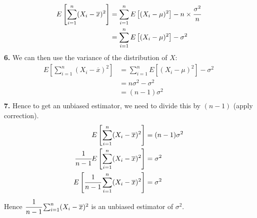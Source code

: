 \documentclass{report}
\begin{document}
            \[\begin{split}
                E\left[ \sum_{i = 1}^n ( X_i - \overline{x} )^2 \right] &= \sum_{i = 1}^n E\left[ (X_i - \mu)^2 \right] - n \times \cfrac{\sigma^2}{n}\\
                &= \sum_{i = 1}^n E\left[ (X_i - \mu)^2 \right] - \sigma^2\\
            \end{split}\]
            \textbf{6. } We can then use the variance of the distribution of $X$:
            \[\begin{split}
                E\left[ \sum_{i = 1}^n ( X_i - \overline{x} )^2 \right] &= \sum_{i = 1}^n E\left[ (X_i - \mu)^2 \right] - \sigma^2\\
                &= n \sigma^2 - \sigma^2\\
                &= (n - 1) \sigma^2\\
            \end{split}\]
            \textbf{7. } Hence to get an unbiased estimator, we need to divide this by $(n-1)$ (apply correction).
            \[\begin{split}
                E\left[ \sum_{i = 1}^n ( X_i - \overline{x} )^2 \right] &= (n - 1) \sigma^2\\
                \cfrac{1}{n-1} E\left[ \sum_{i = 1}^n ( X_i - \overline{x} )^2 \right] &= \sigma^2 \\
                E\left[\cfrac{1}{n-1} \sum_{i = 1}^n ( X_i - \overline{x} )^2 \right] &= \sigma^2 \\
            \end{split}\]
            Hence $\cfrac{1}{n-1} \sum_{i = 1}^n ( X_i - \overline{x} )^2 $ is an unbiased estimator of $\sigma^2$.
\end{document}
